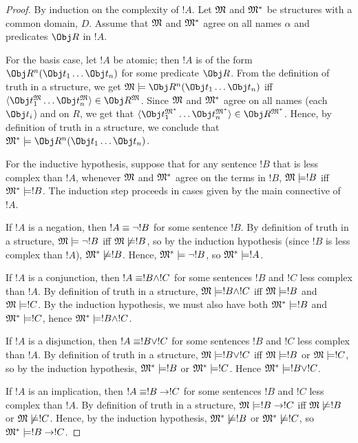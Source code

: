 \documentclass[syntax-and-semantics]{subfiles}
\begin{document}
\begin{proof} By induction on the complexity of $!A$. Let $\mathfrak{M}$ and $\mathfrak{M}^*$ be structures with a common domain, $D$. Assume that $\mathfrak{M}$ and $\mathfrak{M}^*$ agree on all names $\alpha$ and predicates $\Obj R$ in $!A$.

For the basis case, let $!A$ be atomic; then $!A$ is of the form $\Obj R^n(\Obj t_1 \ldots \Obj t_n)$ for some predicate $\Obj R$. From the definition of truth in a structure, we get $\Struct{M} \Sat \Obj R^n(\Obj t_1 \ldots \Obj t_n)$ iff $\langle \Obj t_1^\Struct{M} \ldots \Obj t_n^\Struct{M} \rangle \in \Obj R^\Struct{M}$. Since $\mathfrak{M}$ and $\mathfrak{M}^*$ agree on all names (each $\Obj t_i$) and on $R$, we get that $\langle \Obj t_1^{\Struct{M}^*} \ldots \Obj t_n^{\Struct{M}^*} \rangle \in \Obj R^{\Struct{M}^*}$. Hence, by definition of truth in a structure, we conclude that $\Struct{M}^* \Sat \Obj R^n(\Obj t_1 \ldots \Obj t_n)$. 

For the inductive hypothesis, suppose that for any sentence $!B$ that is less complex than $!A$, whenever $\mathfrak{M}$ and $\mathfrak{M}^*$ agree on the terms in $!B$, $\mathfrak{M} \models !B$ iff $\mathfrak{M}^* \models !B$. The induction step proceeds in cases given by the main connective of $!A$.

If $!A$ is a negation, then $!A \equiv \lnot !B$ for some sentence $!B$. By definition of truth in a structure, $\mathfrak{M} \models \lnot !B$ iff $\mathfrak{M} \not\models !B$, so by the induction hypothesis (since $!B$ is less complex than $!A$), $\mathfrak{M}^* \not\models !B$. Hence, $\mathfrak{M}^* \models \lnot !B$, so $\mathfrak{M}^* \models !A$.

If $!A$ is a conjunction, then $!A \equiv !B \land !C$ for some sentences $!B$ and $!C$ less complex than $!A$. By definition of truth in a structure, $\mathfrak{M} \models !B \land !C$ iff $\mathfrak{M} \models !B$ and $\mathfrak{M} \models !C$. By the induction hypothesis, we must also have both $\mathfrak{M}^* \models !B$ and $\mathfrak{M}^* \models !C$, hence $\mathfrak{M}^* \models !B \land !C$.

If $!A$ is a disjunction, then $!A \equiv !B \lor !C$ for some sentences $!B$ and $!C$ less complex than $!A$. By definition of truth in a structure, $\mathfrak{M} \models !B \lor !C$ iff $\mathfrak{M} \models !B$ or $\mathfrak{M} \models !C$, so by the induction hypothesis, $\mathfrak{M}^* \models !B$ or $\mathfrak{M}^* \models !C$. Hence $\mathfrak{M}^* \models !B \lor !C$. 

If $!A$ is an implication, then $!A \equiv !B \to !C$ for some sentences $!B$ and $!C$ less complex than $!A$. By definition of truth in a structure, $\mathfrak{M} \models !B \to !C$ iff $\mathfrak{M} \not\models !B$ or $\mathfrak{M} \not\models !C$. Hence, by the induction hypothesis, $\mathfrak{M}^* \not\models !B$ or $\mathfrak{M}^* \not\models !C$, so $\mathfrak{M}^* \models !B \to !C$.


\end{proof}
\end{document}
